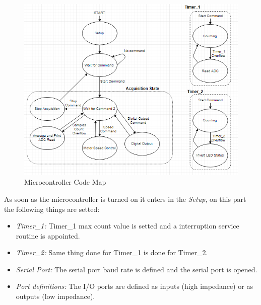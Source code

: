 	\begin{figure}[htbp]
		\centering
		\includegraphics[scale=1]{figuras/fig-microCodeMap}
		\caption{Microcontroller Code Map \cite{microCodeMap}}
		\label{fig:microCode}
	\end{figure}
	
	
	As soon as the microcontroller is turned on it enters in the \textit{Setup}, on this part the following things are setted:
	\begin{itemize}
		\item \textit{Timer\_1: } Timer\_1 max count value is setted and a interruption service routine is appointed.\label{itm:mcu-prog-timer1}
		\item \textit{Timer\_2: } Same thing done for Timer\_1 is done for Timer\_2.\label{itm:mcu-prog-timer2}
		\item \textit{Serial Port: } The serial port baud rate is defined and the serial port is opened.\label{itm:mcu-prog-serial-port}
		\item \textit{Port definitions: } The I/O ports are defined as inputs (high impedance) or as outputs (low impedance).\label{itm:mcu-prog-port}
	\end{itemize}
	
